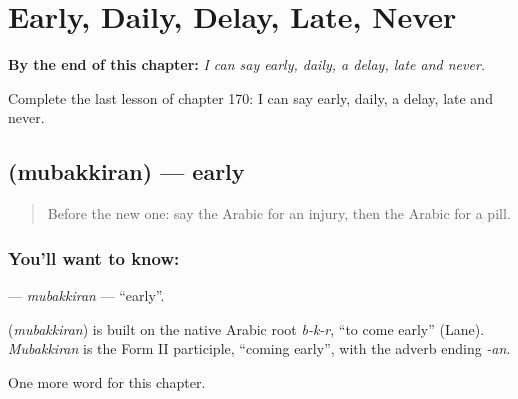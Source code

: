 
\chapter{Early, Daily, Delay, Late, Never}
\label{ch:ar-early-daily-delay-late-never}

\begin{chapteropening}
\textbf{By the end of this chapter:} \emph{I can say early, daily, a delay, late and never.}

Complete the last lesson of chapter 170: I can say early, daily, a delay, late and never.
\end{chapteropening}

\section[\texorpdfstring{\ar{مبكرا} (mubakkiran)}{مبكرا (mubakkiran)}]{ (mubakkiran) — early}

\label{lesson:AR-C170-mubakkiran}



\begin{quote}
Before the new one: say the Arabic for an injury, then the Arabic for a pill.
\end{quote}

\subsection*{You'll want to know: }
\textbf{} — \emph{mubakkiran} — \textquotedblleft{}early\textquotedblright{}.

\begin{cousinweb}
\textbf{} (\emph{mubakkiran}) is built on the native Arabic root \emph{b-k-r}, \textquotedblleft{}to come early\textquotedblright{} (Lane). \emph{Mubakkiran} is the Form II participle, \textquotedblleft{}coming early\textquotedblright{}, with the adverb ending \emph{-an}.
\end{cousinweb}

\begin{grammarlens}[title={What you've built}]
One more word for this chapter.
\end{grammarlens}


